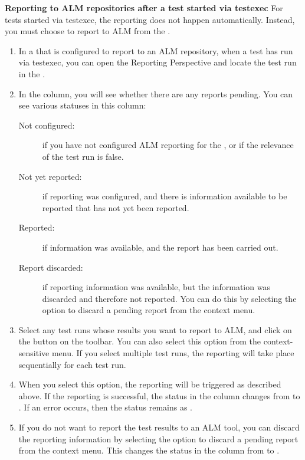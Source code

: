 \textbf{Reporting to ALM repositories after a test started via testexec}
\label{TasksALMReportTestExec}
For tests started via testexec, the reporting does not happen automatically. Instead, you must choose to report to ALM from the \gdtestsummaryview{}.

\begin{enumerate}
\item In a \gdproject{} that is configured to report to an ALM repository, when a test has run via testexec, you can open the Reporting Perspective and locate the test run in the \gdtestsummaryview{}.
\item In the  column, you will see whether there are any reports pending. You can see various statuses in this column:

\begin{description}
\item [Not configured:]{if you have not configured ALM reporting for the \gdproject{}, or if the relevance of the test run is false.}
\item [Not yet reported:]{if reporting was configured, and there is information available to be reported that has not yet been reported.}
\item [Reported:]{if information was available, and the report has been carried out.}
\item [Report discarded:]{if reporting information was available, but the information was discarded and therefore not reported. You can do this by selecting the option to discard a pending report from the context menu.}
\end{description}
\item Select any test runs whose results you want to report to ALM, and click on the  button on the toolbar. You can also select this option from the context-sensitive menu. If you select multiple test runs, the reporting will take place sequentially for each test run. 
\item When you select this option, the reporting will be triggered as described above. If the reporting is successful, the status in the  column changes from  to . If an error occurs, then the status remains as . 
\item If you do not want to report the test results to an ALM tool, you can discard the reporting information by selecting the option to discard a pending report from the context menu. This changes the status in the  column  from  to .
\end{enumerate}



